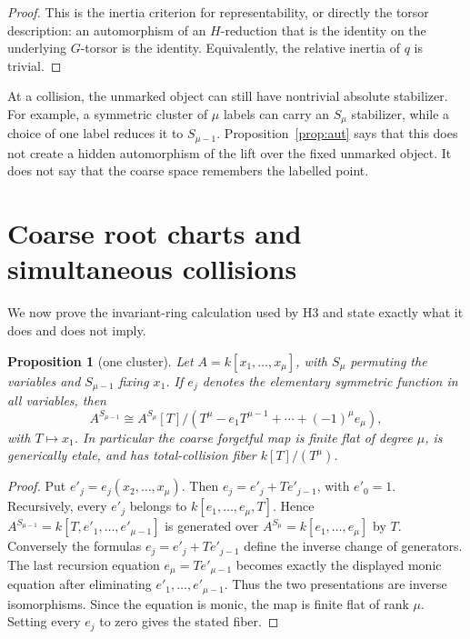 \documentclass[11pt]{article}
\newtheorem{proposition}[theorem]{Proposition}
\begin{document}
\begin{proof}
This is the inertia criterion for representability, or directly the torsor
description: an automorphism of an $H$-reduction that is the identity on the
underlying $G$-torsor is the identity.  Equivalently, the relative inertia of
$q$ is trivial.
\end{proof}

At a collision, the unmarked object can still have nontrivial absolute
stabilizer.  For example, a symmetric cluster of $\mu$ labels can carry an
$S_\mu$ stabilizer, while a choice of one label reduces it to
$S_{\mu-1}$.  Proposition~\ref{prop:aut} says that this does not create a
hidden automorphism of the lift over the fixed unmarked object.  It does not
say that the coarse space remembers the labelled point.

\section{Coarse root charts and simultaneous collisions}

We now prove the invariant-ring calculation used by H3 and state exactly
what it does and does not imply.

\begin{proposition}[one cluster]\label{prop:invariants}
Let $A=k[x_1,\ldots,x_\mu]$, with $S_\mu$ permuting the variables and
$S_{\mu-1}$ fixing $x_1$.  If $e_j$ denotes the elementary symmetric
function in all variables, then
\[
 A^{S_{\mu-1}}
 \cong A^{S_\mu}[T]/
 (T^\mu-e_1T^{\mu-1}+\cdots+(-1)^\mu e_\mu),          \tag{4.1}
\]
with $T\mapsto x_1$.  In particular the coarse forgetful map is finite flat
of degree $\mu$, is generically etale, and has total-collision fiber
$k[T]/(T^\mu)$.
\end{proposition}

\begin{proof}
Put $e'_j=e_j(x_2,\ldots,x_\mu)$.  Then
$e_j=e'_j+Te'_{j-1}$, with $e'_0=1$.  Recursively, every $e'_j$ belongs to
$k[e_1,\ldots,e_\mu,T]$.  Hence $A^{S_{\mu-1}}=k[T,e'_1,\ldots,e'_{\mu-1}]$
is generated over $A^{S_\mu}=k[e_1,\ldots,e_\mu]$ by $T$.  Conversely the
formulas $e_j=e'_j+Te'_{j-1}$ define the inverse change of generators.  The
last recursion equation $e_\mu=Te'_{\mu-1}$ becomes exactly the displayed
monic equation after eliminating $e'_1,\ldots,e'_{\mu-1}$.  Thus the two
presentations are inverse isomorphisms.  Since the equation is monic, the
map is finite flat of rank $\mu$.  Setting every $e_j$ to zero gives the
stated fiber.
\end{proof}
\end{document}
